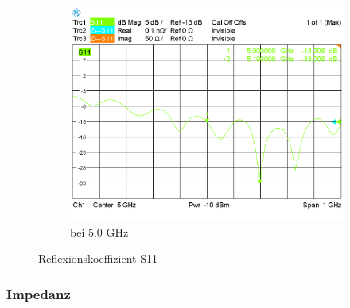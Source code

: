 \begin{figure}[htbp]
\begin{center}
\begin{subfigure}[t]{0.49\textwidth}
\begin{center}
				\includegraphics[width=1\textwidth]{../fig/plt/S11_WITH_5_0.PNG}
				\caption{bei 5.0 GHz}
				\label{fig:S11_with_full_5.0}
			\end{center}
		\end{subfigure}
		\caption{Reflexionskoeffizient S11}
		\label{fig:S11_each}
	\end{center}
\end{figure}

\subsubsection{Impedanz}

